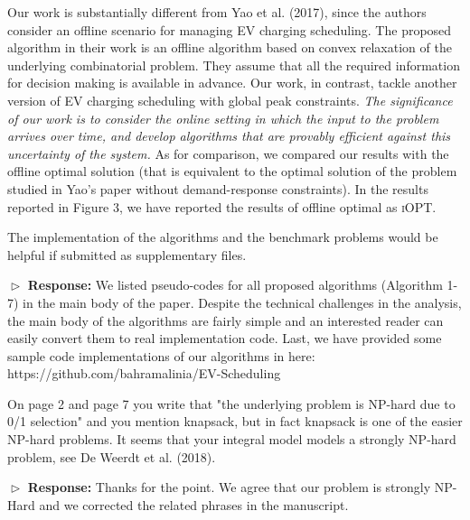 \documentclass[11pt]{article}
\begin{document}
Our work is substantially different from Yao et al. (2017), since the authors consider an offline scenario for managing EV charging scheduling. The proposed algorithm in their work is an offline algorithm based on convex relaxation of the underlying combinatorial problem. They assume that all the required information for decision making is available in advance. Our work, in contrast, tackle another version of EV charging scheduling with global peak constraints. \textit{The significance of our work is to consider the online setting in which the input to the problem arrives over time, and develop algorithms that are provably efficient against this uncertainty of the system.} As for comparison, we compared our results with the offline optimal solution (that is equivalent to the optimal solution of the problem studied in Yao's paper without demand-response constraints). In the results reported in Figure 3, we have reported the results of offline optimal as \textsc{iOPT}. 


\vspace{3mm}
{\color{blue} The implementation of the algorithms and the benchmark problems would be helpful if submitted as supplementary files. }
\vspace{3mm}

$\vartriangleright$ \noindent\textbf{Response:} 
We listed pseudo-codes for all proposed algorithms (Algorithm 1-7) in the main body of the paper. Despite the technical challenges in the analysis, the main body of the algorithms are fairly simple and an interested reader can easily convert them to real implementation code. Last, we have provided some sample code implementations of our algorithms in 
here: https://github.com/bahramalinia/EV-Scheduling
  
\vspace{3mm}
{\color{blue} On page 2 and page 7 you write that "the underlying problem is NP-hard due to 0/1 selection" and you mention knapsack, but in fact knapsack is one of the easier NP-hard problems. It seems that your integral model models a strongly NP-hard problem, see De Weerdt et al. (2018). }
\vspace{3mm}

$\vartriangleright$ \noindent\textbf{Response:} 
Thanks for the point. We agree that our problem is strongly NP-Hard and we corrected the related phrases in the manuscript. 
\end{document}

